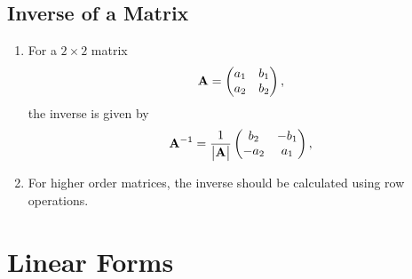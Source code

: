 \documentclass[journal,12pt,onecolumn]{IEEEtran}
\renewcommand\thesection{\arabic{section}}
\renewcommand\thesubsection{\thesection.\arabic{subsection}}
\begin{document}
\subsection{Inverse of a Matrix}
\renewcommand{\theequation}{\theenumi}
\begin{enumerate}[label=\thesubsection.\arabic*.,ref=\thesubsection.\theenumi]
\item For a $2 \times 2$ matrix 
\begin{align}
	\mathbf{A} = \begin{pmatrix}a_1 & b_1  \\ a_2 & b_2 \end{pmatrix},
\end{align}
the inverse is given by 
\begin{align}
	\mathbf{A}^{-1} = \frac{1}{\begin{vmatrix}\mathbf{A}\end{vmatrix}}\begin{pmatrix}b_2 & -b_1  \\ -a_2 & a_1 \end{pmatrix},
\end{align}
\item For higher order matrices, the inverse should be calculated using row operations.
\end{enumerate}
\section{Linear Forms}
\end{document}
